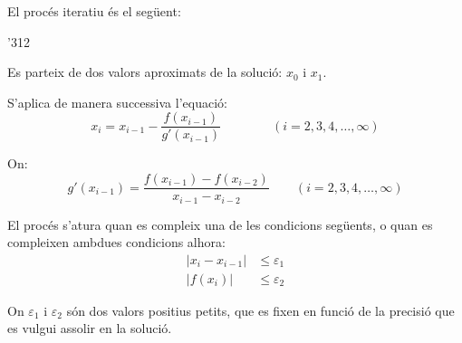 El procés iteratiu és el següent:

\begin{dingautolist}{'312}
    \item Es parteix de dos valors aproximats de la solució: $x_0$ i $x_1$.

    \item   S'aplica de manera successiva l'equació:
            \begin{equation}\label{eq:secant-1}
              x_i = x_{i-1} - \frac{f(x_{i-1})}{g'(x_{i-1})} \qquad\qquad (i=2,3,4,\dots,\infty)
            \end{equation}

            On:
            \begin{equation}\label{eq:secant-2}
              g'(x_{i-1}) = \frac{f(x_{i-1}) - f(x_{i-2}) } {x_{i-1} - x_{i-2}} \qquad (i=2,3,4,\dots,\infty)
            \end{equation}

    \item   El procés s'atura quan es compleix una de les condicions següents, o quan es compleixen ambdues condicions alhora:
            \begin{subequations}\begin{align}
              |x_i - x_{i-1}| &\leq \varepsilon_1 \\
              |f(x_i)| &\leq \varepsilon_2
            \end{align}\end{subequations}

            On $\varepsilon_1$ i $\varepsilon_2$ són dos valors positius petits, que es fixen en funció de la precisió que es vulgui assolir en la solució.
\end{dingautolist}


